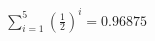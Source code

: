 \documentclass[preview]{standalone}
\begin{document}
\begin{align*}
\sum_{i=1}^{5} \left(\frac{1}{2}\right)^i = {0.96875}
\end{align*}
\end{document}
